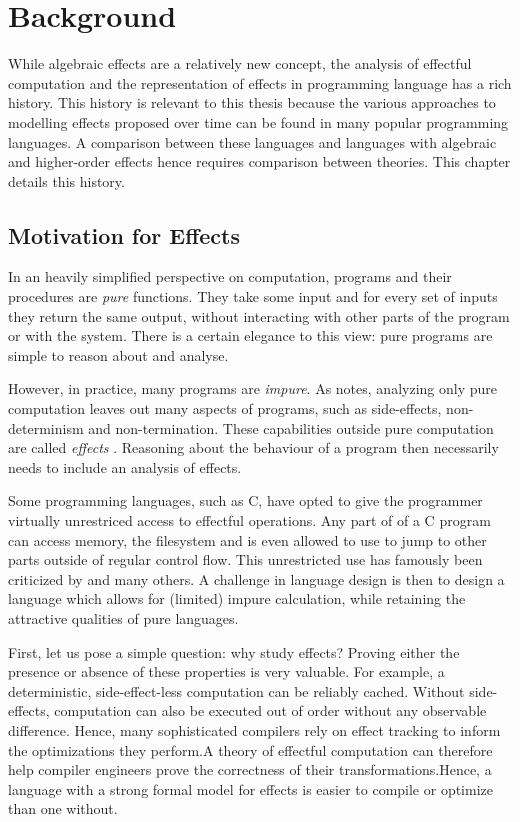 \chapter{Background}\label{chap:background}

While algebraic effects are a relatively new concept, the analysis of effectful computation and the representation of effects in programming language has a rich history. This history is relevant to this thesis because the various approaches to modelling effects proposed over time can be found in many popular programming languages. A comparison between these languages and languages with algebraic and higher-order effects hence requires comparison between theories. This chapter details this history.

\section{Motivation for Effects}

In an heavily simplified perspective on computation, programs and their procedures are \emph{pure} functions. They take some input and for every set of inputs they return the same output, without interacting with other parts of the program or with the system. There is a certain elegance to this view: pure programs are simple to reason about and analyse.

However, in practice, many programs are \emph{impure}. As \textcite{moggi_computational_1989} notes, analyzing only pure computation leaves out many aspects of programs, such as side-effects, non-determinism and non-termination. These capabilities outside pure computation are called \emph{effects} \autocite{moggi_computational_1989}. Reasoning about the behaviour of a program then necessarily needs to include an analysis of effects.

Some programming languages, such as C, have opted to give the programmer virtually unrestriced access to effectful operations. Any part of of a C program can access memory, the filesystem and is even allowed to use  to jump to other parts outside of regular control flow. \citationneeded This unrestricted use has famously been criticized by \textcite{dijkstra_letters_1968} and many others. A challenge in language design is then to design a language which allows for (limited) impure calculation, while retaining the attractive qualities of pure languages.

First, let us pose a simple question: why study effects? Proving either the presence or absence of these properties is very valuable. For example, a deterministic, side-effect-less computation can be reliably cached. Without side-effects, computation can also be executed out of order without any observable difference. Hence, many sophisticated compilers rely on effect tracking to inform the optimizations they perform.\citationneeded A theory of effectful computation can therefore help compiler engineers prove the correctness of their transformations.\citationneeded Hence, a language with a strong formal model for effects is easier to compile or optimize than one without.

